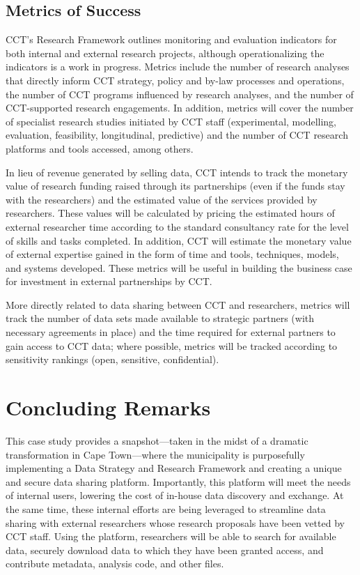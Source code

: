 \documentclass[
]{book}
\begin{document}
\hypertarget{metrics-of-success-5}{%
\subsection{Metrics of Success}\label{metrics-of-success-5}}

CCT's Research Framework outlines monitoring and evaluation indicators for both internal and external research projects, although operationalizing the indicators is a work in progress. Metrics include the number of research analyses that directly inform CCT strategy, policy and by-law processes and operations, the number of CCT programs influenced by research analyses, and the number of CCT-supported research engagements. In addition, metrics will cover the number of specialist research studies initiated by CCT staff (experimental, modelling, evaluation, feasibility, longitudinal, predictive) and the number of CCT research platforms and tools accessed, among others.

In lieu of revenue generated by selling data, CCT intends to track the monetary value of research funding raised through its partnerships (even if the funds stay with the researchers) and the estimated value of the services provided by researchers. These values will be calculated by pricing the estimated hours of external researcher time according to the standard consultancy rate for the level of skills and tasks completed. In addition, CCT will estimate the monetary value of external expertise gained in the form of time and tools, techniques, models, and systems developed. These metrics will be useful in building the business case for investment in external partnerships by CCT.

More directly related to data sharing between CCT and researchers, metrics will track the number of data sets made available to strategic partners (with necessary agreements in place) and the time required for external partners to gain access to CCT data; where possible, metrics will be tracked according to sensitivity rankings (open, sensitive, confidential).

\hypertarget{concluding-remarks-2}{%
\section{Concluding Remarks}\label{concluding-remarks-2}}

This case study provides a snapshot---taken in the midst of a dramatic transformation in Cape Town---where the municipality is purposefully implementing a Data Strategy and Research Framework and creating a unique and secure data sharing platform. Importantly, this platform will meet the needs of internal users, lowering the cost of in-house data discovery and exchange. At the same time, these internal efforts are being leveraged to streamline data sharing with external researchers whose research proposals have been vetted by CCT staff. Using the platform, researchers will be able to search for available data, securely download data to which they have been granted access, and contribute metadata, analysis code, and other files.
\end{document}
